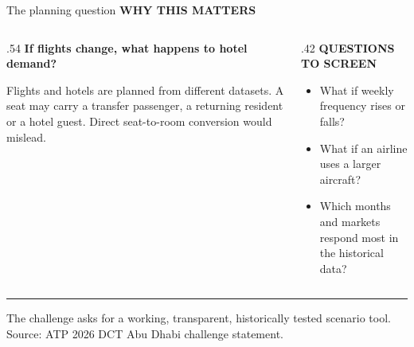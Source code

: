 \documentclass[aspectratio=169,10pt]{beamer}
\newcommand{\kicker}[1]{{\color{Accent}\scriptsize\bfseries\MakeUppercase{#1}}\par\vspace{.16cm}}
\newcommand{\smallnote}[1]{{\color{Muted}\scriptsize #1}}
\begin{document}
\begin{frame}{The planning question}
  \kicker{Why this matters}
  \begin{columns}[T,totalwidth=\linewidth]
    \begin{column}{.54\linewidth}
      {\fontsize{21}{24}\selectfont\bfseries If flights change, what happens to hotel demand?}\par\vspace{.20cm}
      Flights and hotels are planned from different datasets. A seat may carry a transfer passenger, a returning resident or a hotel guest. Direct seat-to-room conversion would mislead.
    \end{column}
    \begin{column}{.42\linewidth}
      \kicker{Questions to screen}
      \begin{itemize}\setlength\itemsep{.16cm}
        \item What if weekly frequency rises or falls?
        \item What if an airline uses a larger aircraft?
        \item Which months and markets respond most in the historical data?
      \end{itemize}
    \end{column}
  \end{columns}
  \vfill
  {\color{Accent}\rule{.07cm}{.45cm}}\hspace{.15cm}%
  \smallnote{The challenge asks for a working, transparent, historically tested scenario tool. Source: ATP 2026 DCT Abu Dhabi challenge statement.}
\end{frame}
\end{document}
